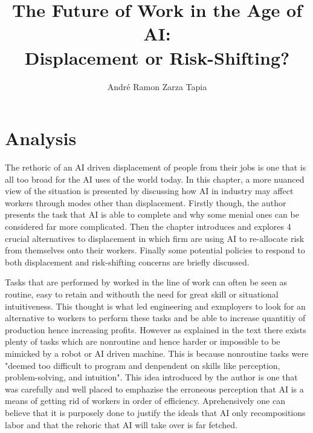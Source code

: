 \documentclass[a4paper,11pt,oneside]{report}
\title{The Future of Work in the Age of AI:\\ Displacement or Risk-Shifting?}
\author{André Ramon Zarza Tapia}
\begin{document}
\maketitle



\chapter{Analysis}

The rethoric of an AI driven displacement of people from their jobs is one that is all too broad for the AI uses of the world today. In this chapter, a more nuanced view of the situation is presented by discussing how AI in industry may affect workers through modes other than displacement. Firstly though, the author presents the task that AI is able to complete and why some menial ones can be considered far more complicated. Then the chapter introduces and explores 4 crucial alternatives to displacement in which firm are using AI to re-allocate risk from themselves onto their workers. Finally some potential policies to respond to both displacement and risk-shifting concerns are briefly discussed.

Tasks that are performed by worked in the line of work can often be seen as routine, easy to retain and withouth the need for great skill or situational intuitiveness. This thought is what led engineering and exmployers to look for an alternative to workers to perform these tasks and be able to increase quantitiy of production hence increasing profits. However as explained in the text there exists plenty of tasks which are nonroutine and hence harder or impossible to be mimicked by a robot or AI driven machine. This is because nonroutine tasks were "deemed too difficult to program and denpendent on skills like perception, problem-solving, and intuition". This idea introduced by the author is one that was carefully and well placed to emphazise the erroneous perception that AI is a means of getting rid of workers in order of efficiency. Aprehensively one can believe that it is purposely done to justify the ideals that AI only recompositions labor and that the rehoric that AI will take over is far fetched.
\end{document}
